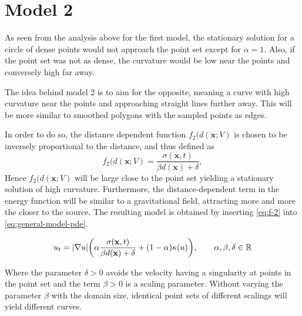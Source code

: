 \section{Model 2}
As seen from the analysis above for the first model, the stationary solution for a circle of dense points would not approach the point set except for $\alpha=1$. Also, if the point set was not as dense, the curvature would be low near the points and conversely high far away.

The idea behind model 2 is to aim for the opposite, meaning a curve with high curvature near the points and approaching straight lines further away. This will be more similar to smoothed polygons with the sampled points as edges. 

In order to do so, the distance dependent function $f_2(d(\mathbf{x}; V)$ is chosen to be inversely proportional to the distance, and thus defined as
\begin{equation}
    f_2(d(\mathbf{x}; V) = \frac{\sigma(\mathbf{x}, t)}{\beta d(\mathbf{x})+\delta},
    \label{eq:f-2}
\end{equation}
Hence $f_2(d(\mathbf{x}; V)$ will be large close to the point set yielding a stationary solution of high curvature. Furthermore, the distance-dependent term in the energy function will be similar to a gravitational field, attracting more and more the closer to the source. The resulting model is obtained by inserting \eqref{eq:f-2} into \eqref{eq:general-model-pde}.

\begin{tcolorbox}[title=Model 2]
\begin{equation}
    u_t = |\nabla u| \bigg(\alpha \frac{ \sigma(\mathbf{x}, t)}{\beta d(\mathbf{x})+\delta} + (1-\alpha)\kappa (u) \bigg), \qquad \alpha, \beta, \delta \in \mathbb{R}
    \label{eq:model2-pde}
\end{equation}
\end{tcolorbox}
Where the parameter $\delta>0$ avoids the velocity having a singularity at points in the point set and the term $\beta>0$ is a scaling parameter. Without varying the parameter $\beta$ with the domain size, identical point sets of different scalings will yield different curves.

